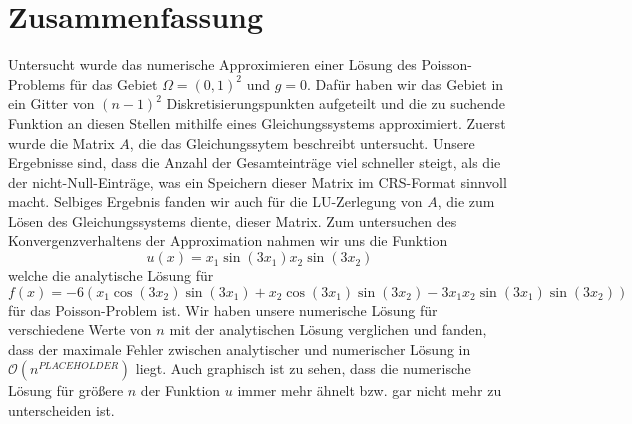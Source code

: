 \documentclass{scrartcl}
\theoremstyle{remark}
\begin{document}
\section{Zusammenfassung}
Untersucht wurde das numerische Approximieren einer Lösung des Poisson-Problems für das Gebiet \(\Omega = (0, 1)^2\) und \(g = 0\).
Dafür haben wir das Gebiet in ein Gitter von \((n - 1)^2\) Diskretisierungspunkten aufgeteilt und die zu suchende Funktion an diesen Stellen
mithilfe eines Gleichungssystems approximiert. Zuerst wurde die Matrix \(A\), die das Gleichungssytem beschreibt untersucht. 
Unsere Ergebnisse sind, dass die Anzahl der Gesamteinträge viel schneller steigt, als die der nicht-Null-Einträge, was ein Speichern
dieser Matrix im CRS-Format sinnvoll macht. Selbiges Ergebnis fanden wir auch für die LU-Zerlegung von \(A\), die zum Lösen des Gleichungssystems diente,
dieser Matrix.
Zum untersuchen des Konvergenzverhaltens der Approximation nahmen wir uns die Funktion
\[u(x) = x_{1}\sin(3x_{1})x_{2}\sin(3x_{2})\]
welche die analytische Lösung für
\[f(x) = -6(x_{1}\cos(3x_{2})\sin(3x_{1}) + x_{2}\cos(3x_{1})\sin(3x_{2}) - 3x_{1}x_{2}\sin(3x_{1})\sin(3x_{2}))\]
für das Poisson-Problem ist.
Wir haben unsere numerische Lösung für verschiedene Werte von \(n\) mit der analytischen Lösung verglichen und fanden,
dass der maximale Fehler zwischen analytischer und numerischer Lösung in \(\mathcal{O}(n^{PLACEHOLDER})\) liegt.
Auch graphisch ist zu sehen, dass die numerische Lösung für größere \(n\) der Funktion \(u\) immer mehr ähnelt bzw.
gar nicht mehr zu unterscheiden ist. 


\printbibliography
\end{document}
